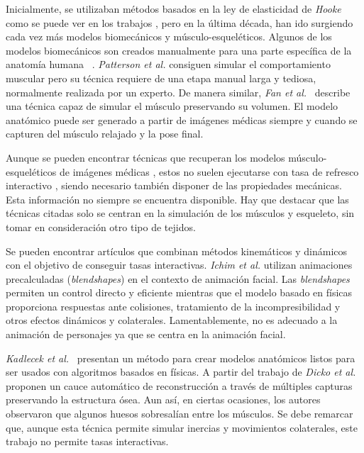 Inicialmente, se utilizaban métodos basados en la ley de elasticidad de \emph{Hooke} como se puede ver en los trabajos \cite{russell93,wilhelms1995modeling}, pero en la última década, han ido surgiendo cada vez más modelos biomecánicos y músculo-esqueléticos. Algunos de los modelos biomecánicos son creados manualmente para una parte específica de la anatomía humana ~\cite{Lee2009}. \emph{Patterson et al.} \cite{Patterson2012} consiguen simular el comportamiento muscular pero su técnica requiere de una etapa manual larga y tediosa, normalmente realizada por un experto. De manera similar, \emph{Fan et al.}~ \cite{Fan2014} describe una técnica capaz de simular el músculo preservando su volumen. El modelo anatómico puede ser generado a partir de imágenes médicas siempre y cuando se capturen del músculo relajado y la pose final. 

Aunque se pueden encontrar técnicas que recuperan los modelos músculo-esqueléticos de imágenes médicas \cite{blemker2007, gilles2010, schmid2009}, estos no suelen ejecutarse con tasa de refresco interactivo%
, siendo necesario también disponer de las propiedades mecánicas. Esta información no siempre se encuentra disponible. Hay que destacar que las técnicas citadas solo se centran en la simulación de los músculos y esqueleto, sin tomar en consideración otro tipo de tejidos.

Se pueden encontrar artículos que combinan métodos kinemáticos y dinámicos con el objetivo de conseguir tasas interactivas.  \emph{Ichim et al.} \cite{Ichim:2016} utilizan animaciones precalculadas (\emph{blendshapes}) en el contexto de animación facial. Las \emph{blendshapes} permiten un control directo y eficiente mientras que el modelo basado en físicas proporciona respuestas ante colisiones, tratamiento de la incompresibilidad y otros efectos dinámicos y colaterales. Lamentablemente, no es adecuado a la animación de personajes ya que se centra en la animación facial. 


\emph{Kadlecek et al.}~\cite{kadlecek-16-reconstructing} presentan un método para crear modelos anatómicos listos para ser usados con algoritmos basados en físicas. A partir del trabajo de \emph{Dicko et al.} \cite{Ali2013} proponen un cauce automático de reconstrucción a través de múltiples capturas preservando la estructura ósea. Aun así, en ciertas ocasiones, los autores observaron que algunos huesos sobresalían entre los músculos. Se debe remarcar que, aunque esta técnica permite simular inercias y movimientos colaterales, este trabajo no permite tasas interactivas.   %

